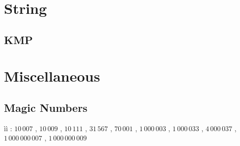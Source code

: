 \documentclass[10pt,landscape,a4paper,twocolumn]{article}
\begin{document}
\section{String}

\subsection{KMP}


%

%


%


\section{Miscellaneous}

%

\subsection{Magic Numbers}

ìì : $10\,007$ , $10\,009$ , $10\,111$ , $31\,567$ , $70\,001$ , $1\,000\,003$ , $1\,000\,033$ , $4\,000\,037$ , $1\,000\,000\,007$ , $1\,000\,000\,009$

%
\end{document}
